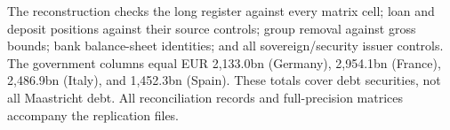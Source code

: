 The reconstruction checks the long register against every matrix cell; loan and deposit positions against their source controls; group removal against gross bounds; bank balance-sheet identities; and all sovereign/security issuer controls. The government columns equal EUR 2,133.0bn (Germany), 2,954.1bn (France), 2,486.9bn (Italy), and 1,452.3bn (Spain). These totals cover debt securities, not all Maastricht debt. All reconciliation records and full-precision matrices accompany the replication files.

\FloatBarrier
